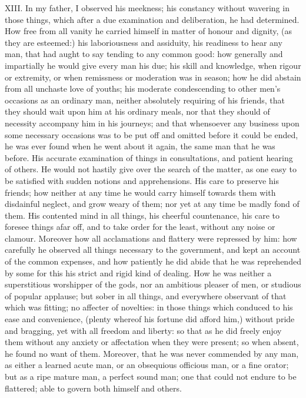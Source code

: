 XIII. In my father, I observed his meekness; his constancy without
wavering in those things, which after a due examination and deliberation,
he had determined. How free from all vanity he carried himself in matter
of honour and dignity, (as they are esteemed:) his laboriousness and
assiduity, his readiness to hear any man, that had aught to say tending to
any common good: how generally and impartially he would give every man his
due; his skill and knowledge, when rigour or extremity, or when remissness
or moderation was in season; how he did abstain from all unchaste love of
youths; his moderate condescending to other men's occasions as an ordinary
man, neither absolutely requiring of his friends, that they should wait
upon him at his ordinary meals, nor that they should of necessity
accompany him in his journeys; and that whensoever any business upon some
necessary occasions was to be put off and omitted before it could be
ended, he was ever found when he went about it again, the same man that he
was before. His accurate examination of things in consultations, and
patient hearing of others. He would not hastily give over the search of
the matter, as one easy to be satisfied with sudden notions and
apprehensions. His care to preserve his friends; how neither at any time
he would carry himself towards them with disdainful neglect, and grow
weary of them; nor yet at any time be madly fond of them. His contented
mind in all things, his cheerful countenance, his care to foresee things
afar off, and to take order for the least, without any noise or clamour.
Moreover how all acclamations and flattery were repressed by him: how
carefully he observed all things necessary to the government, and kept an
account of the common expenses, and how patiently he did abide that he was
reprehended by some for this his strict and rigid kind of dealing. How he
was neither a superstitious worshipper of the gods, nor an ambitious
pleaser of men, or studious of popular applause; but sober in all things,
and everywhere observant of that which was fitting; no affecter of
novelties: in those things which conduced to his ease and convenience,
(plenty whereof his fortune did afford him,) without pride and bragging,
yet with all freedom and liberty: so that as he did freely enjoy them
without any anxiety or affectation when they were present; so when absent,
he found no want of them. Moreover, that he was never commended by any
man, as either a learned acute man, or an obsequious officious man, or a
fine orator; but as a ripe mature man, a perfect sound man; one that could
not endure to be flattered; able to govern both himself and others.

